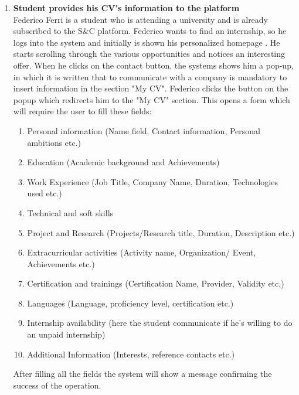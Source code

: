 \begin{enumerate}
      \item \textbf{Student provides his CV's information to the platform}\\
      Federico Ferri is a student who is attending a university and is already subscribed to the S\&C platform.
      Federico wants to find an internship, so he logs into the system and initially is shown his personalized homepage . He starts scrolling through the various opportunities and notices an interesting offer. When he clicks on the contact button, the systems shows him a pop-up, in which it is written that to communicate with a company is mandatory to insert information in the section "My CV".
      Federico clicks the button on the popup which redirects him to the "My CV" section. 
      This opens a form which will require the user to fill these fields:
      \begin{enumerate}
		    \item Personal information (Name field, Contact information, Personal ambitions etc.) 
		      \item Education (Academic background and Achievements)
                \item Work Experience (Job Title, Company Name, Duration, Technologies used etc.)
            \item Technical and soft skills 
            \item Project and Research (Projects/Research title, Duration, Description etc.)
            \item Extracurricular activities (Activity name, Organization/ Event, Achievements etc.)
            \item Certification and trainings (Certification Name, Provider, Validity etc.)
            \item Languages (Language, proficiency level, certification etc.)
            \item Internship availability (here the student communicate if he's willing to do an unpaid internship)
            \item Additional Information (Interests, reference contacts etc.)
    \end{enumerate}
After filling all the fields the system will show a message confirming the success of the operation. 
     

\end{enumerate}
